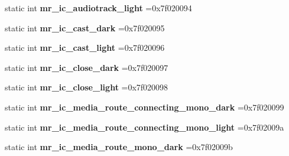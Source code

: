 \begin{DoxyCompactItemize}
\mbox{\label{classandroid_1_1support_1_1design_1_1R_1_1drawable_a002b0f8adbfdf1ee725da84a59bf514c}} 
static int {\bfseries mr\+\_\+ic\+\_\+audiotrack\+\_\+light} =0x7f020094
\item 
\mbox{\label{classandroid_1_1support_1_1design_1_1R_1_1drawable_af94f95b49fc9c1404f56a3e436d1fd78}} 
static int {\bfseries mr\+\_\+ic\+\_\+cast\+\_\+dark} =0x7f020095
\item 
\mbox{\label{classandroid_1_1support_1_1design_1_1R_1_1drawable_a80bae8a84c7a9238525991ee145304b8}} 
static int {\bfseries mr\+\_\+ic\+\_\+cast\+\_\+light} =0x7f020096
\item 
\mbox{\label{classandroid_1_1support_1_1design_1_1R_1_1drawable_a59254735ceeaea8914f0e810a1a83d83}} 
static int {\bfseries mr\+\_\+ic\+\_\+close\+\_\+dark} =0x7f020097
\item 
\mbox{\label{classandroid_1_1support_1_1design_1_1R_1_1drawable_ab505406e35483f6a75efaa6947d51f8b}} 
static int {\bfseries mr\+\_\+ic\+\_\+close\+\_\+light} =0x7f020098
\item 
\mbox{\label{classandroid_1_1support_1_1design_1_1R_1_1drawable_a8eaf6fc09dbf77a36f30f6720b61f258}} 
static int {\bfseries mr\+\_\+ic\+\_\+media\+\_\+route\+\_\+connecting\+\_\+mono\+\_\+dark} =0x7f020099
\item 
\mbox{\label{classandroid_1_1support_1_1design_1_1R_1_1drawable_ad2c1ab50511acb2d38069aa2fc063094}} 
static int {\bfseries mr\+\_\+ic\+\_\+media\+\_\+route\+\_\+connecting\+\_\+mono\+\_\+light} =0x7f02009a
\item 
\mbox{\label{classandroid_1_1support_1_1design_1_1R_1_1drawable_a21908695d1539f50a9f874618d88bb2b}} 
static int {\bfseries mr\+\_\+ic\+\_\+media\+\_\+route\+\_\+mono\+\_\+dark} =0x7f02009b
\item 

\end{DoxyCompactItemize}
